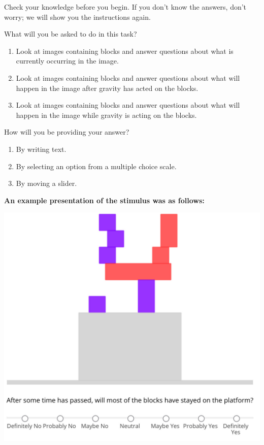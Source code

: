 \documentclass[10pt,letterpaper]{article}
\begin{document}
\begin{displayquote}

Check your knowledge before you begin. If you don't know the answers, don't worry; we will show you the instructions again.

What will you be asked to do in this task?

\begin{enumerate}
    \item Look at images containing blocks and answer questions about what is currently occurring in the image.
    \item Look at images containing blocks and answer questions about what will happen in the image after gravity has acted on the blocks.
    \item Look at images containing blocks and answer questions about what will happen in the image while gravity is acting on the blocks.
\end{enumerate}

How will you be providing your answer?

\begin{enumerate}
    \item By writing text.
    \item By selecting an option from a multiple choice scale.
    \item By moving a slider.
\end{enumerate}
    
\end{displayquote}

\textbf{An example presentation of the stimulus was as follows:}

\begin{center}
    \includegraphics[scale=.2]{images/IMG_1108.jpeg}
\end{center}
\end{document}

